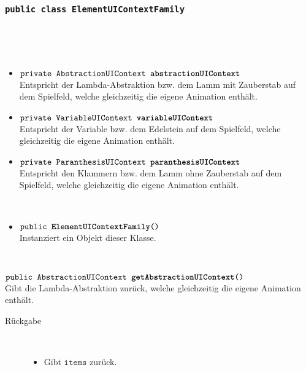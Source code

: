 	\subsubsection{\normalfont \texttt{public class \textbf{ElementUIContextFamily}}}

\begin{description}
\item[Beschreibung] \hfill \\ 
\item[Attribute] \hfill \\
	\vspace{-.8cm}
	\begin{itemize}	
		\item $\texttt{private AbstractionUIContext \textbf{abstractionUIContext}}$ \\ Entspricht der Lambda-Abstraktion bzw. dem Lamm mit Zauberstab auf dem Spielfeld, welche gleichzeitig die eigene Animation enthält.
		\item $\texttt{private VariableUIContext \textbf{variableUIContext}}$ \\ Entspricht der Variable bzw. dem Edelstein auf dem Spielfeld, welche gleichzeitig die eigene Animation enthält.
		\item $\texttt{private ParanthesisUIContext \textbf{paranthesisUIContext}}$ \\ Entspricht den Klammern bzw. dem Lamm ohne Zauberstab auf dem Spielfeld, welche gleichzeitig die eigene Animation enthält.
		\end{itemize}
	
\item[Konstruktoren] \hfill \\
	\vspace{-.8cm}
	\begin{itemize}
		\item $\texttt{public \textbf{ElementUIContextFamily}()}$ \\ Instanziert ein Objekt dieser Klasse.

	\end{itemize}
	
\item[Methoden] \hfill \\
	\vspace{-.8cm}
		\item $\texttt{public AbstractionUIContext \textbf{getAbstractionUIContext}()}$ \\ Gibt die Lambda-Abstraktion zurück, welche gleichzeitig die eigene Animation enthält.
		\begin{description}
			\item[Rückgabe] \hfill \\
			\vspace{-.8cm}
			\begin{itemize}
				\item Gibt $\texttt{items}$ zurück.
			\end{itemize}
			\end{description}
			

\end{description}
